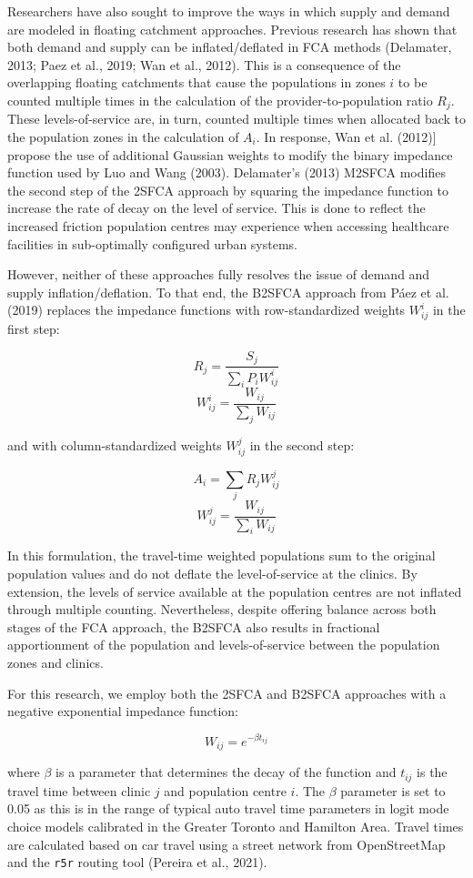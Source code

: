 \documentclass[]{elsarticle} %
\begin{document}
Researchers have also sought to improve the ways in which supply and
demand are modeled in floating catchment approaches. Previous research
has shown that both demand and supply can be inflated/deflated in FCA
methods (Delamater, 2013; Paez et al., 2019; Wan et al., 2012). This is
a consequence of the overlapping floating catchments that cause the
populations in zones \(i\) to be counted multiple times in the
calculation of the provider-to-population ratio \(R_j\). These
levels-of-service are, in turn, counted multiple times when allocated
back to the population zones in the calculation of \(A_i\). In response,
Wan et al. (2012){]} propose the use of additional Gaussian weights to
modify the binary impedance function used by Luo and Wang (2003).
Delamater's (2013) M2SFCA modifies the second step of the 2SFCA approach
by squaring the impedance function to increase the rate of decay on the
level of service. This is done to reflect the increased friction
population centres may experience when accessing healthcare facilities
in sub-optimally configured urban systems.

However, neither of these approaches fully resolves the issue of demand
and supply inflation/deflation. To that end, the B2SFCA approach from
Páez et al. (2019) replaces the impedance functions with
row-standardized weights \(W_{ij}^{i}\) in the first step:

\[
R_j = \frac{S_j}{\sum_i{P_iW_{ij}^{i}}}
\] \[
W_{ij}^{i} = \frac{W_{ij}}{\sum_j W_{ij}}
\]

and with column-standardized weights \(W_{ij}^{j}\) in the second step:

\[
A_i = \sum_j{R_jW_{ij}^{j}}
\] \[
W_{ij}^{j} = \frac{W_{ij}}{\sum_i W_{ij}}
\]

In this formulation, the travel-time weighted populations sum to the
original population values and do not deflate the level-of-service at
the clinics. By extension, the levels of service available at the
population centres are not inflated through multiple counting.
Nevertheless, despite offering balance across both stages of the FCA
approach, the B2SFCA also results in fractional apportionment of the
population and levels-of-service between the population zones and
clinics.

For this research, we employ both the 2SFCA and B2SFCA approaches with a
negative exponential impedance function:

\[
W_{ij} = e^{-\beta t_{ij}}
\]

where \(\beta\) is a parameter that determines the decay of the function
and \(t_{ij}\) is the travel time between clinic \(j\) and population
centre \(i\). The \(\beta\) parameter is set to 0.05 as this is in the
range of typical auto travel time parameters in logit mode choice models
calibrated in the Greater Toronto and Hamilton Area. Travel times are
calculated based on car travel using a street network from OpenStreetMap
and the \texttt{r5r} routing tool (Pereira et al., 2021).
\end{document}
